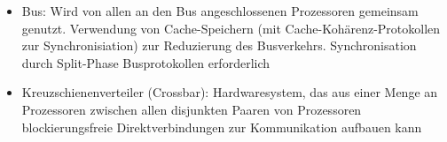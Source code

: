 \begin{itemize}
\begin{itemize}
\begin{itemize}
			\item Bus: Wird von allen an den Bus angeschlossenen Prozessoren gemeinsam genutzt. Verwendung von Cache-Speichern (mit Cache-Kohärenz-Protokollen zur Synchronisiation) zur Reduzierung des Busverkehrs. Synchronisation durch Split-Phase Busprotokollen erforderlich
			\item Kreuzschienenverteiler (Crossbar): Hardwaresystem, das aus einer Menge an Prozessoren zwischen allen disjunkten Paaren von Prozessoren blockierungsfreie Direktverbindungen zur Kommunikation aufbauen kann
		\end{itemize}
	\end{itemize}
\end{itemize}
